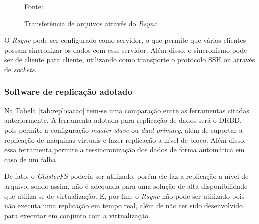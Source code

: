 \begin{figure}[h!]
 \centering
 \caption{Transferência de arquivos através do \textit{Rsync}.}
 Fonte: \citet{lopez2012}
 \label{fig:rsync}
\end{figure}


O \textit{Rsync} pode ser configurado como servidor, o que permite que vários clientes possam sincronizar os dados com esse servidor. 
Além disso, o sincronismo pode ser de cliente para cliente, utilizando como transporte o protocolo \ac{SSH} ou através de \textit{sockets}.


\subsubsection{Software de replicação adotado}
\label{section:replicacaoescolhido}

Na Tabela \ref{tab:replicacao} tem-se uma comparação entre as ferramentas citadas anteriormente. 
A ferramenta adotada para replicação de dados será o \ac{DRBD}, pois permite a configuração \textit{master-slave} ou \textit{dual-primary}, 
além de suportar a replicação de máquinas virtuais e fazer replicação a nível de bloco. Além disso, essa ferramenta permite a ressincronização 
dos dados de forma automática em caso de um falha \cite{drbd}.

De fato, o \textit{GlusterFS} poderia ser utilizado, porém ele faz a replicação a nível de arquivo, sendo assim, não é adequada para uma 
solução de alta disponibilidade que utiliza-se de virtualização. 
E, por fim, o \textit{Rsync} não pode ser utilizado pois não executa uma replicação em tempo real, além de não ter sido desenvolvido para
executar em conjunto com a virtualização.



